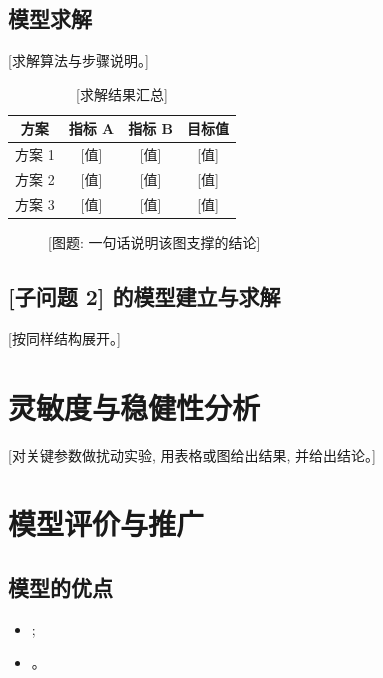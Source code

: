 \documentclass[zihao=-4,a4paper]{ctexart}
\begin{document}
\subsection{模型求解}

[求解算法与步骤说明。]

\begin{table}[H]
  \centering
  \caption{[求解结果汇总]}
  \begin{tabular}{cccc}
    \toprule
    方案 & 指标 A & 指标 B & 目标值 \\
    \midrule
    方案 1 & [值] & [值] & [值] \\
    方案 2 & [值] & [值] & [值] \\
    方案 3 & [值] & [值] & [值] \\
    \bottomrule
  \end{tabular}
\end{table}

\begin{figure}[H]
  \centering
  \caption{[图题: 一句话说明该图支撑的结论]}
\end{figure}

\subsection{[子问题 2] 的模型建立与求解}

[按同样结构展开。]

\section{灵敏度与稳健性分析}

[对关键参数做扰动实验, 用表格或图给出结果, 并给出结论。]

\section{模型评价与推广}

\subsection{模型的优点}

\begin{itemize}
  \item [优点 1];
  \item [优点 2]。
\end{itemize}
\end{document}
